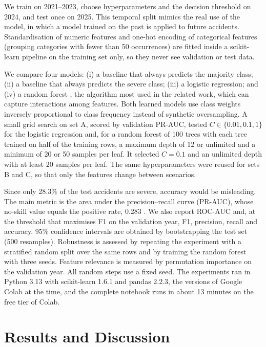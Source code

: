 \documentclass[12pt]{article}
\begin{document}
We train on 2021--2023, choose hyperparameters and the decision threshold on
2024, and test once on 2025. This temporal split mimics the real use of the
model, in which a model trained on the past is applied to future accidents.
Standardisation of numeric features and one-hot encoding of categorical
features (grouping categories with fewer than 50 occurrences) are fitted inside
a scikit-learn pipeline \cite{pedregosa2011} on the training set only, so they
never see validation or test data.

We compare four models: (i) a baseline that always predicts the majority
class; (ii) a baseline that always predicts the severe class; (iii) a logistic
regression; and (iv) a random forest \cite{breiman2001}, the algorithm most
used in the related work, which can capture interactions among features. Both
learned models use class weights inversely proportional to class frequency
instead of synthetic oversampling. A small grid search on set A, scored by
validation PR-AUC, tested $C \in \{0.01, 0.1, 1\}$ for the logistic regression
and, for a random forest of 100 trees with each tree trained on half of the
training rows, a maximum depth of 12 or unlimited and a minimum of 20 or 50
samples per leaf. It selected $C = 0.1$ and an unlimited depth with at least 20
samples per leaf. The same hyperparameters were reused for sets B and C, so
that only the features change between scenarios.

Since only 28.3\% of the test accidents are severe, accuracy would be
misleading. The main metric is the area under the precision--recall curve
(PR-AUC), whose no-skill value equals the positive rate, 0.283
\cite{saito2015}. We also report ROC-AUC and, at the threshold that maximises
F1 on the validation year, F1, precision, recall and accuracy. 95\% confidence
intervals are obtained by bootstrapping the test set (500 resamples).
Robustness is assessed by repeating the experiment with a stratified random
split over the same rows and by training the random forest with three seeds.
Feature relevance is measured by permutation importance on the validation year.
All random steps use a fixed seed. The experiments ran in Python 3.13 with
scikit-learn 1.6.1 and pandas 2.2.3, the versions of Google Colab at the time,
and the complete notebook runs in about 13 minutes on the free tier of Colab.

\section{Results and Discussion}
\end{document}
